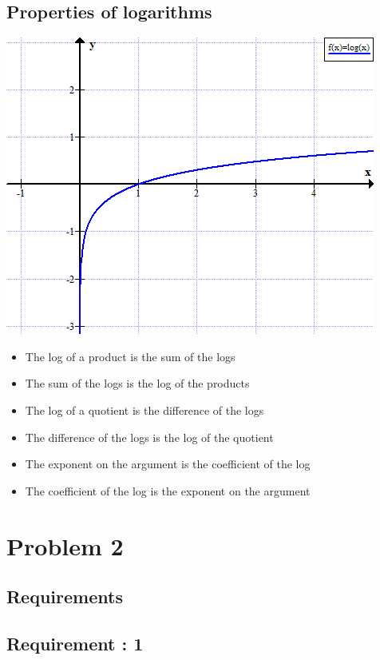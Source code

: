 \documentclass[12pt]{report}
\begin{document}
{ \subsection{Properties of logarithms}
 \begin{minipage}{0.25\textwidth}
    \includegraphics[width=\textwidth, height= 5.5 cm]{log_graph.png}
    \end{minipage}
    \begin{minipage}{0.9\textwidth}
    \begin{itemize}
      \item The log of a product is the sum of the logs
      \item The sum of the logs is the log of the products
      \item The log of a quotient is the difference of the logs
      \item The difference of the logs is the log of the quotient
      \item The exponent on the argument is the coefficient of the log
      \item The coefficient of the log is the exponent on the argument
    \end{itemize}
    \end{minipage}
    
\clearpage
    
\section{Problem 2}
\subsection{Requirements}
\subsection*{Requirement : 1}
    
}
\end{document}
